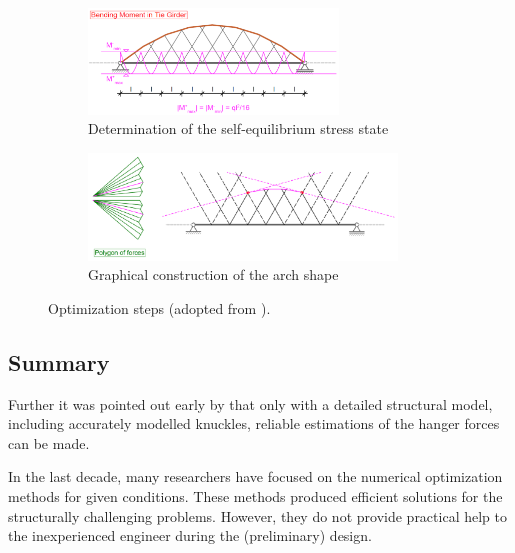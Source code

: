 \begin{figure}[H]
\centering
\begin{subfigure}{0.5\textwidth}
    \centering
    \includegraphics[width=0.73\textwidth]{Pictures/OptimizedBendingMoment.PNG}
    \caption{Determination of the self-equilibrium stress state}
    \label{fig:Cavegn3}
\end{subfigure}%
\begin{subfigure}{.5\textwidth}
    \centering
    \includegraphics[width=0.9\textwidth]{Pictures/GraphicalThrustLineConstruction.PNG}
    \caption{Graphical construction of the arch shape}
    \label{fig:Cavegn4}
\end{subfigure}
\caption{Optimization steps (adopted from \cite{Cavegn}).}
\label{fig:Cavegn34}
\end{figure}

\newpage
\subsection{Summary} \label{sec:rev_sum}

Further it was pointed out early by \citep{Geissler} that only with a detailed structural model, including accurately modelled knuckles, reliable estimations of the hanger forces can be made.

In the last decade, many researchers have focused on the numerical optimization methods for given conditions. These methods produced efficient solutions for the structurally challenging problems. However, they do not provide practical help to the inexperienced engineer during the (preliminary) design. 
